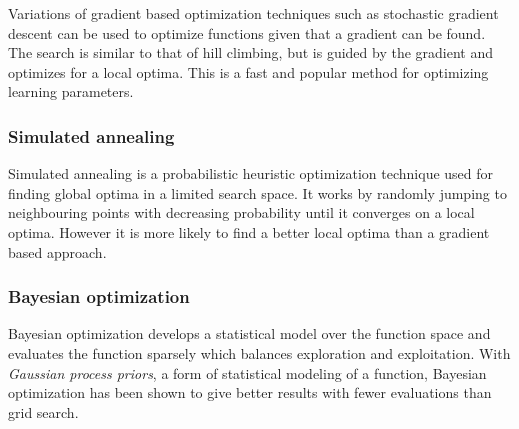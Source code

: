 Variations of gradient based optimization techniques such as stochastic gradient descent can be used to optimize functions given that a gradient can be found. The search is similar to that of hill climbing, but is guided by the gradient and optimizes for a local optima.  This is a fast and popular method for optimizing learning parameters.
\cite{hu2008collaborative}


\subsubsection{Simulated annealing}

Simulated annealing is a probabilistic heuristic optimization technique used for finding global optima in a limited search space. It works by randomly jumping to neighbouring points with decreasing probability until it converges on a local optima. However it is more likely to find a better local optima than a gradient based approach. \citep{norvigAI}


\subsubsection{Bayesian optimization}

Bayesian optimization develops a statistical model over the function space and evaluates the function sparsely which balances exploration and exploitation.  With \textit{Gaussian process priors}, a form of statistical modeling of a function, Bayesian optimization has been shown to give better results with fewer evaluations than grid search. \citep{snoek2012practical}

